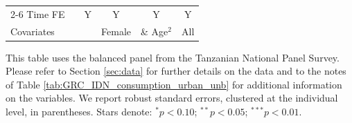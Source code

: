 \begin{table}[htbp]
\begin{threeparttable}
\begin{tabular}{l ccccc}
\cmidrule{2-6} Time FE & & Y & Y & Y & Y \\ Covariates & & & Female & \& Age$^2$ & All \\ \bottomrule \end{tabular} \begin{tablenotes}[flushleft] \footnotesize \item{This table uses the balanced panel from the Tanzanian National Panel Survey. Please refer to Section \ref{sec:data} for further details on the data and to the notes of Table \ref{tab:GRC_IDN_consumption_urban_unb} for additional information on the variables. We report robust standard errors, clustered at the individual level, in parentheses. Stars denote: $^{*} p<0.10$; $^{**} p<0.05$; $^{***} p<0.01$.} \end{tablenotes} \end{threeparttable} \end{table}
